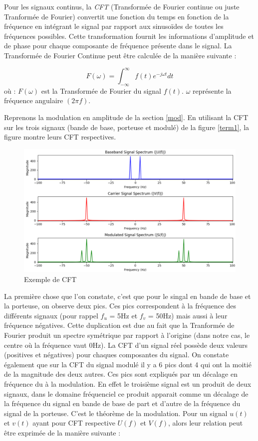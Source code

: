 \vspace{0.1cm}

Pour les signaux continus, la \textit{CFT} (Transformée de Fourier continue ou juste Tranformée de Fourier) convertit une fonction du temps en fonction de la fréquence en intégrant le signal par rapport aux sinusoïdes de toutes les fréquences possibles. Cette transformation fournit les informations d'amplitude et de phase pour chaque composante de fréquence présente dans le signal. La Transformée de Fourier Continue peut être calculée de la manière suivante :  

\begin{equation}
F(\omega) = \int_{-\infty}^{\infty} f(t)e^{-j\omega t} dt
\end{equation}
où : $F(\omega)$ est la Transformée de Fourier du signal $f(t)$. $\omega$ représente la fréquence angulaire $(2 \pi f)$.

Reprenons la modulation en amplitude de la section \ref{mod}. En utilisant la CFT sur les trois signaux (bande de base, porteuse et modulé) de la figure \ref{term1}, la figure montre leurs CFT respectives.

\begin{figure}[h]
\centering

\includegraphics[scale=0.5]{images/CFT.PNG}
\caption{Exemple de CFT}\label{term8}
\end{figure}

La première chose que l'on constate, c'est que pour le singal en bande de base et la porteuse, on observe deux pics. Ces pics correspondent à la fréquence des différents signaux (pour rappel $f_u$ = 5Hz et $f_v$ = 50Hz) mais aussi à leur fréquence négatives. Cette duplication est due au fait que la Tranformée de Fourier produit un spectre symétrique par rapport à l'origine (dans notre cas, le centre où la fréquence vaut 0Hz). La CFT d'un signal réel possède deux valeurs (positives et négatives) pour chaques composantes du signal. On constate également que sur la CFT du signal modulé il y a 6 pics dont 4 qui ont la moitié de la magnitude des deux autres. Ces pics sont expliqués par un décalage en fréquence du à la modulation. En effet le troisième signal est un produit de deux signaux, dans le domaine fréquenciel ce produit apparait comme un décalage de la fréquence du signal en bande de base de part et d'autre de la fréquence du signal de la porteuse. C'est le théorème de la modulation. Pour un signal $u(t)$ et $v(t)$ ayant pour CFT respective $U(f)$ et $V(f)$, alors leur relation peut être exprimée de la manière suivante :

